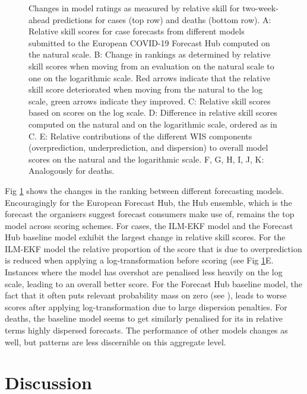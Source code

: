 \documentclass[10pt,letterpaper]{article}
\begin{document}
\begin{figure}[h!]
    \centering
    \caption{Changes in model ratings as measured by relative skill for two-week-ahead predictions for cases (top row) and deaths (bottom row). A: Relative skill scores for case forecasts from different models submitted to the European COVID-19 Forecast Hub computed on the natural scale. B: Change in rankings as determined by relative skill scores when moving from an evaluation on the natural scale to one on the logarithmic scale. Red arrows indicate that the relative skill score deteriorated when moving from the natural to the log scale, green arrows indicate they improved. C: Relative skill scores based on scores on the log scale. D: Difference in relative skill scores computed on the natural and on the logarithmic scale, ordered as in C. E: Relative contributions of the different WIS components (overprediction, underprediction, and dispersion) to overall model scores on the natural and the logarithmic scale. F, G, H, I, J, K: Analogously for deaths.}
    \label{fig:HUB-rank-order}
\end{figure}

Fig \ref{fig:HUB-rank-order} shows the changes in the ranking between different forecasting models. Encouragingly for the European Forecast Hub, the Hub ensemble, which is the forecast the organisers suggest forecast consumers make use of, remains the top model across scoring schemes. For cases, the ILM-EKF model and the Forecast Hub baseline model exhibit the largest change in relative skill scores. For the ILM-EKF model the relative proportion of the score that is due to overprediction is reduced when applying a log-transformation before scoring (see Fig \ref{fig:HUB-rank-order}E. Instances where the model has overshot are penalised less heavily on the log scale, leading to an overall better score. For the Forecast Hub baseline model, the fact that it often puts relevant probability mass on zero (see ), leads to worse scores after applying log-transformation due to large dispersion penalties. For deaths, the baseline model seems to get similarly penalised for its in relative terms highly dispersed forecasts. The performance of other models changes as well, but patterns are less discernible on this aggregate level. 

\section*{Discussion}
\label{sec:discussion}
\end{document}
